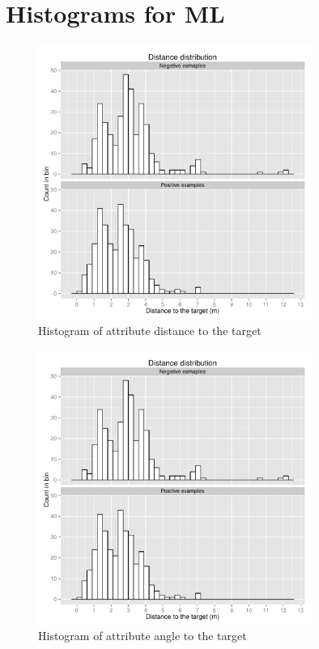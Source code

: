 \section{Histograms for ML}

\begin{figure}[!htbp]
  \centering
	\includegraphics[page=1,width=0.8\textwidth]{Images/fref_distrib}
	\caption{Histogram of attribute distance to the target}
	\label{fig:fref-distrib-dist}
\end{figure}

\begin{figure}[!htbp]
  \centering
	\includegraphics[page=2,width=0.8\textwidth]{Images/fref_distrib}
	\caption{Histogram of attribute angle to the target}
	\label{fig:fref-distrib-angle}
\end{figure}

